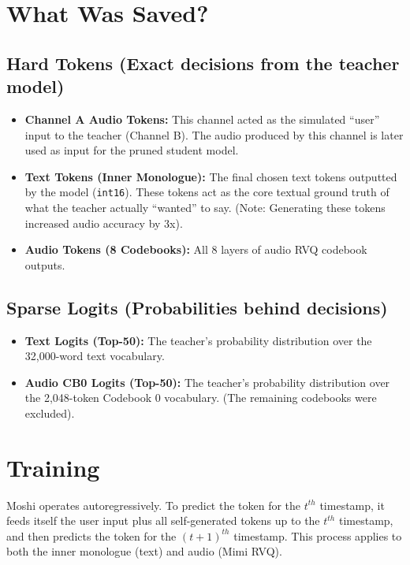 \documentclass[12pt]{article}
\begin{document}
\section{What Was Saved?}

\subsection{Hard Tokens (Exact decisions from the teacher model)}
\begin{itemize}
    \item \textbf{Channel A Audio Tokens:} This channel acted as the simulated ``user'' input to the teacher (Channel B). The audio produced by this channel is later used as input for the pruned student model.
    \item \textbf{Text Tokens (Inner Monologue):} The final chosen text tokens outputted by the model (\texttt{int16}). These tokens act as the core textual ground truth of what the teacher actually ``wanted'' to say. (Note: Generating these tokens increased audio accuracy by 3x).
    \item \textbf{Audio Tokens (8 Codebooks):} All 8 layers of audio RVQ codebook outputs.
\end{itemize}

\subsection{Sparse Logits (Probabilities behind decisions)}
\begin{itemize}
    \item \textbf{Text Logits (Top-50):} The teacher's probability distribution over the 32,000-word text vocabulary.
    \item \textbf{Audio CB0 Logits (Top-50):} The teacher's probability distribution over the 2,048-token Codebook 0 vocabulary. (The remaining codebooks were excluded).
\end{itemize}

\section{Training}

Moshi operates autoregressively. To predict the token for the $t^{th}$ timestamp, it feeds itself the user input plus all self-generated tokens up to the $t^{th}$ timestamp, and then predicts the token for the $(t + 1)^{th}$ timestamp. This process applies to both the inner monologue (text) and audio (Mimi RVQ).
\end{document}
